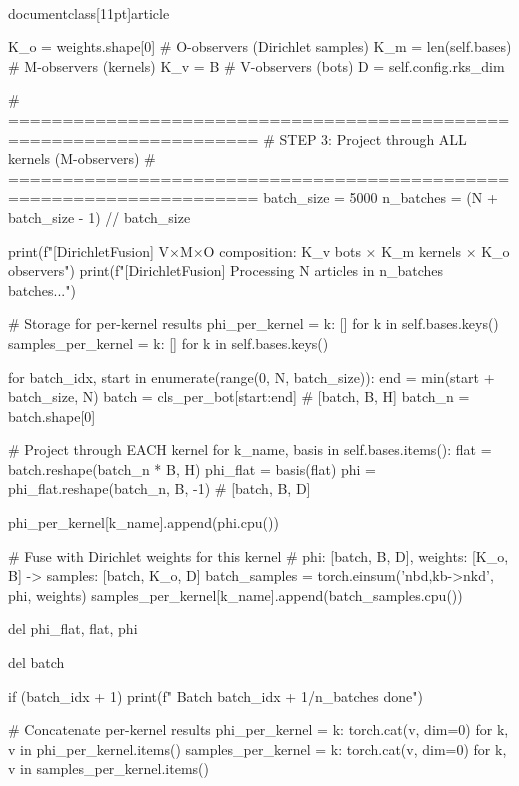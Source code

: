 \\documentclass[11pt]{article}
\begin{document}
\begin{CodeBlock}
        K_o = weights.shape[0]  # O-observers (Dirichlet samples)
        K_m = len(self.bases)   # M-observers (kernels)
        K_v = B                  # V-observers (bots)
        D = self.config.rks_dim
        
        # =====================================================================
        # STEP 3: Project through ALL kernels (M-observers)
        # =====================================================================
        batch_size = 5000
        n_batches = (N + batch_size - 1) // batch_size
        
        print(f"[DirichletFusion] V×M×O composition: {K_v} bots × {K_m} kernels × {K_o} observers")
        print(f"[DirichletFusion] Processing {N} articles in {n_batches} batches...")
        
        # Storage for per-kernel results
        phi_per_kernel = {k: [] for k in self.bases.keys()}
        samples_per_kernel = {k: [] for k in self.bases.keys()}
        
        for batch_idx, start in enumerate(range(0, N, batch_size)):
            end = min(start + batch_size, N)
            batch = cls_per_bot[start:end]  # [batch, B, H]
            batch_n = batch.shape[0]
            
            # Project through EACH kernel
            for k_name, basis in self.bases.items():
                flat = batch.reshape(batch_n * B, H)
                phi_flat = basis(flat)
                phi = phi_flat.reshape(batch_n, B, -1)  # [batch, B, D]
                
                phi_per_kernel[k_name].append(phi.cpu())
                
                # Fuse with Dirichlet weights for this kernel
                # phi: [batch, B, D], weights: [K_o, B] -> samples: [batch, K_o, D]
                batch_samples = torch.einsum('nbd,kb->nkd', phi, weights)
                samples_per_kernel[k_name].append(batch_samples.cpu())
                
                del phi_flat, flat, phi
            
            del batch
            
            if (batch_idx + 1) %
                print(f"  Batch {batch_idx + 1}/{n_batches} done")
        
        # Concatenate per-kernel results
        phi_per_kernel = {k: torch.cat(v, dim=0) for k, v in phi_per_kernel.items()}
        samples_per_kernel = {k: torch.cat(v, dim=0) for k, v in samples_per_kernel.items()}
        

\end{CodeBlock}
\end{document}
